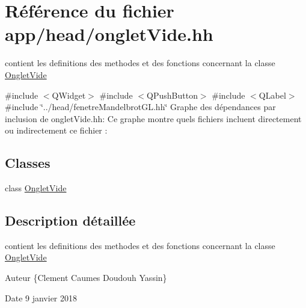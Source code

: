 \hypertarget{ongletVide_8hh}{}\section{Référence du fichier app/head/onglet\+Vide.hh}
\label{ongletVide_8hh}


contient les definitions des methodes et des fonctions concernant la classe \hyperlink{classOngletVide}{Onglet\+Vide}  


{\ttfamily \#include $<$Q\+Widget$>$}\newline
{\ttfamily \#include $<$Q\+Push\+Button$>$}\newline
{\ttfamily \#include $<$Q\+Label$>$}\newline
{\ttfamily \#include \char`\"{}../head/fenetre\+Mandelbrot\+G\+L.\+hh\char`\"{}}\newline
Graphe des dépendances par inclusion de onglet\+Vide.\+hh\+:
Ce graphe montre quels fichiers incluent directement ou indirectement ce fichier \+:
\subsection*{Classes}
\begin{DoxyCompactItemize}
\item 
class \hyperlink{classOngletVide}{Onglet\+Vide}
\end{DoxyCompactItemize}


\subsection{Description détaillée}
contient les definitions des methodes et des fonctions concernant la classe \hyperlink{classOngletVide}{Onglet\+Vide} 

\begin{DoxyAuthor}{Auteur}
\{Clement Caumes Doudouh Yassin\} 
\end{DoxyAuthor}
\begin{DoxyDate}{Date}
9 janvier 2018 
\end{DoxyDate}
